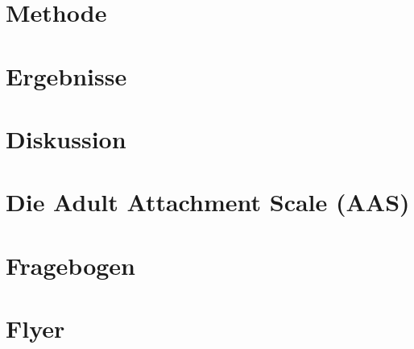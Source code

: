 \section{Methode}\label{sec:Methode}


\section{Ergebnisse}\label{sec:Ergebnisse}


\section{Diskussion}\label{sec:Diskussion}


\begin{flushleft}
\nocite{}
{}
\end{flushleft}

\newpage

\appendix 
\renewcommand{\appendixname}{Anhang} 

\section{Die Adult Attachment Scale (AAS)}\label{app:AAS}

\section{Fragebogen}\label{app:Fragebogen}


\section{Flyer}\label{app:Flyer}





%
%
%